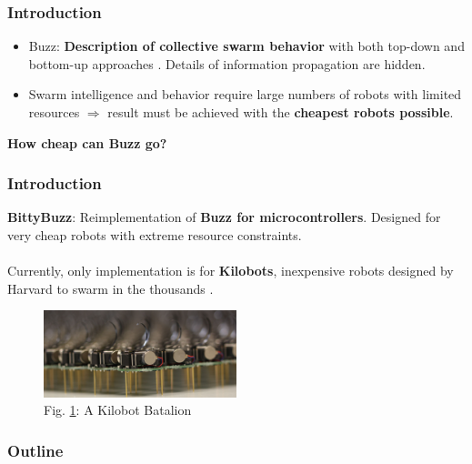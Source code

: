 \documentclass{beamer}
\begin{document}
	\begin{frame}
		\titlepage
	\end{frame}
	\begin{frame}
		\frametitle{Introduction}
		\begin{itemize}
			\item Buzz: \textbf{Description of collective swarm behavior} with both top-down and bottom-up approaches \cite{buzz_arxiv}. Details of information propagation are hidden.
			\item Swarm intelligence and behavior require large numbers of robots with limited resources $\Rightarrow$ result must be achieved with the \textbf{cheapest robots possible}.
		\end{itemize}

		\centering \Large
		\textbf{How cheap can Buzz go?}
	\end{frame}
	\begin{frame}
		\frametitle{Introduction}
		\textbf{BittyBuzz}: Reimplementation of \textbf{Buzz for microcontrollers}. Designed for very cheap robots with extreme resource constraints.\\
		~\\
		Currently, only implementation is for \textbf{Kilobots}, inexpensive robots designed by Harvard to swarm in the thousands \cite{kilobot_paper}.
		\begin{figure}
			\includegraphics[width=0.5\textwidth]{swarm2}
			\caption{\label{figure:Kilobots}Fig. \ref{figure:Kilobots}: A Kilobot Batalion \cite{kilobot_pic}}
		\end{figure}
	\end{frame}
	\begin{frame}
		\frametitle{Outline}
		\tableofcontents
	\end{frame}
\end{document}
